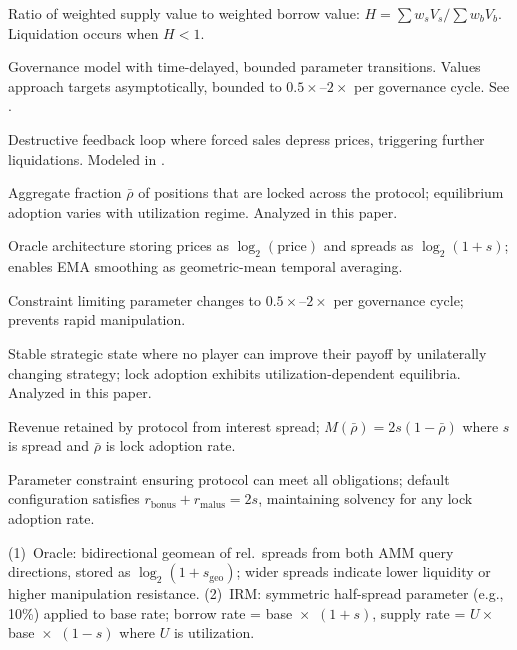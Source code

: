 \documentclass[10pt,a4paper,twocolumn]{article}
\begin{document}
\begin{description}[style=nextline, font=\normalfont\bfseries, leftmargin=1.5em]
\item[Health Factor] Ratio of weighted supply value to weighted borrow value: $H = \sum w_s V_s / \sum w_b V_b$. Liquidation occurs when $H < 1$.

\item[Lethargic Governance] Governance model with time-delayed, bounded parameter transitions. Values approach targets asymptotically, bounded to $0.5\times$--$2\times$ per governance cycle. See \cite[\S A]{wp}.

\item[Liquidation Cascade] Destructive feedback loop where forced sales depress prices, triggering further liquidations. Modeled in \cite{sim}.

\item[Lock Adoption] Aggregate fraction $\bar{\rho}$ of positions that are locked across the protocol; equilibrium adoption varies with utilization regime. Analyzed in this paper.

\item[Log-Space Oracle] Oracle architecture storing prices as $\log_2(\text{price})$ and spreads as $\log_2(1 + s)$; enables EMA smoothing as geometric-mean temporal averaging.

\item[Multiplicative Bounds] Constraint limiting parameter changes to $0.5\times$--$2\times$ per governance cycle; prevents rapid manipulation.

\item[Nash Equilibrium] Stable strategic state where no player can improve their payoff by unilaterally changing strategy; lock adoption exhibits utilization-dependent equilibria. Analyzed in this paper.

\item[Protocol Margin] Revenue retained by protocol from interest spread; $M(\bar{\rho}) = 2s(1-\bar{\rho})$ where $s$ is spread and $\bar{\rho}$ is lock adoption rate.

\item[Solvency Boundary] Parameter constraint ensuring protocol can meet all obligations; default configuration satisfies $r_{\text{bonus}} + r_{\text{malus}} = 2s$, maintaining solvency for any lock adoption rate.

    \item[Spread] (1)~Oracle: bidirectional geomean of rel.\ spreads from both AMM query directions, stored as $\log_2(1 + s_{\text{geo}})$; wider spreads indicate lower liquidity or higher manipulation resistance. (2)~IRM: symmetric half-spread parameter (e.g., 10\%) applied to base rate; borrow rate = base~$\times$~$(1{+}s)$, supply rate = $U \times$ base~$\times$~$(1{-}s)$ where $U$ is utilization.


\end{description}
\end{document}
